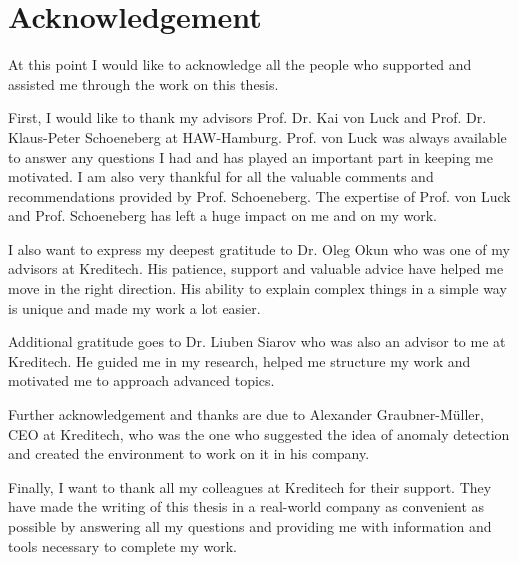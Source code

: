 \documentclass[draft=false
              ,paper=a4
              ,twoside=false
              ,fontsize=11pt
              ,headsepline
              ,BCOR10mm
              ,DIV11
              ]{scrbook}
\begin{document}
\section*{Acknowledgement}
At this point I would like to acknowledge all the people who supported and assisted me through the work on this thesis.

First, I would like to thank my advisors Prof. Dr. Kai von Luck and Prof. Dr. Klaus-Peter Schoeneberg at HAW-Hamburg. Prof. von Luck was always available to answer any questions I had and has played an important part in keeping me motivated. I am also very thankful for all the valuable comments and recommendations provided by Prof. Schoeneberg. The expertise of Prof. von Luck and Prof. Schoeneberg has left a huge impact on me and on my work. 

I also want to express my deepest gratitude to Dr. Oleg Okun who was one of my advisors at Kreditech. His patience, support and valuable advice have helped me move in the right direction. His ability to explain complex things in a simple way is unique and made my work a lot easier.

Additional gratitude goes to Dr. Liuben Siarov who was also an advisor to me at Kreditech. He guided me in my research, helped me structure my work and motivated me to approach advanced topics.

Further acknowledgement and thanks are due to Alexander Graubner-Müller, CEO at Kreditech, who was the one who suggested the idea of anomaly detection and created the environment to work on it in his company.

Finally, I want to thank all my colleagues at Kreditech for their support. They have made the writing of this thesis in a real-world company as convenient as possible by answering all my questions and providing me with information and tools necessary to complete my work.



\tableofcontents
\newpage
\listoftables
\listoffigures

\mainmatter
\onehalfspacing










\end{document}
